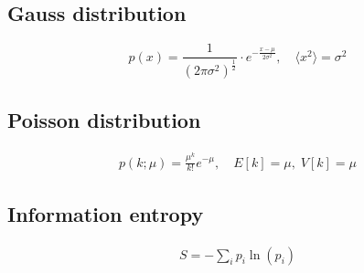 \subsection*{Gauss distribution}

\begin{equation*}
        p(x) = \frac{1}{\left(2 \pi \sigma^2\right)^{\frac{1}{2}}} \cdot e^{-\frac{x-\mu}{2 \sigma^2}}, \quad \langle x^2 \rangle = \sigma^2
\end{equation*}

\subsection*{Poisson distribution}

\begin{equation*}
    \begin{aligned}
        p(k; \mu) = \frac{\mu^k}{k!} e^{- \mu}, \quad E[k] = \mu, \; V[k] = \mu
    \end{aligned}
\end{equation*}

\subsection*{Information entropy}
\begin{equation*}
    \begin{aligned}
        S = - \sum_i p_i \ln (p_i)
    \end{aligned}
\end{equation*}